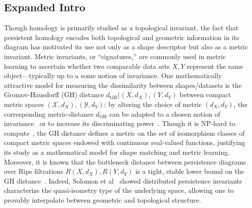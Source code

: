 
\subsection*{Expanded Intro}
Though homology is primarily studied as a topological invariant, the fact that persistent homology encodes both topological and geometric information in its diagram has motivated its use not only as a shape descriptor but also as a metric invariant. 
Metric invariants, or ``signatures,'' are commonly used in metric learning to ascertain whether two comparable data sets $X, Y$ represent the same object---typically up to a some notion of invariance.
One mathematically attractive model for measuring the dissimilarity between shapes/datasets is the Gromov-Hausdorff (GH) distance $d_{\text{GH}}((X, d_X), (Y,d_Y)$ between compact metric spaces $(\mathcal{X}, d_X), (\mathcal{Y}, d_Y)$: by altering the choice of metric $(d_X, d_Y)$, the corresponding metric-distance $d_{\text{GH}}$ can be adapted to a chosen notion of invariance~\cite{} or to increase its discriminating power~\cite{}. 
Though it is NP-hard to compute~\cite{}, the GH distance defines a metric on the set of isomorphism classes of compact metric spaces endowed with continuous real-valued functions, justifying its study as a mathematical model for shape matching and metric learning. 
Moreover, it is known that the bottleneck distance between persistence diagrams over Rips filtrations $R(X, d_X), R(Y, d_Y)$ is a tight, stable lower bound on the GH distance~\cite{}. 
Indeed, Solomon et al~\cite{} showed distributed persistence invariants characterize the quasi-isometry type of the underlying space, allowing one to provably interpolate between geometric and topological structure.

